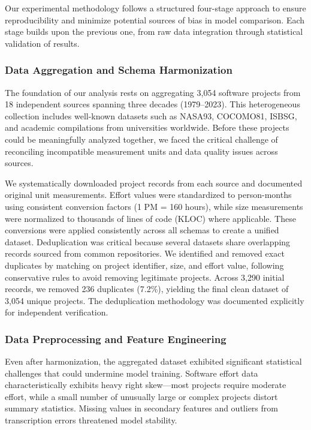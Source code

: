 \documentclass[11pt,a4paper]{article}
\begin{document}
Our experimental methodology follows a structured four-stage approach to ensure reproducibility and minimize potential sources of bias in model comparison. Each stage builds upon the previous one, from raw data integration through statistical validation of results.

\subsubsection{Data Aggregation and Schema Harmonization}

The foundation of our analysis rests on aggregating 3,054 software projects from 18 independent sources spanning three decades (1979--2023). This heterogeneous collection includes well-known datasets such as NASA93, COCOMO81, ISBSG, and academic compilations from universities worldwide. Before these projects could be meaningfully analyzed together, we faced the critical challenge of reconciling incompatible measurement units and data quality issues across sources.

We systematically downloaded project records from each source and documented original unit measurements. Effort values were standardized to person-months using consistent conversion factors (1 PM = 160 hours), while size measurements were normalized to thousands of lines of code (KLOC) where applicable. These conversions were applied consistently across all schemas to create a unified dataset. Deduplication was critical because several datasets share overlapping records sourced from common repositories. We identified and removed exact duplicates by matching on project identifier, size, and effort value, following conservative rules to avoid removing legitimate projects. Across 3,290 initial records, we removed 236 duplicates (7.2\%), yielding the final clean dataset of 3,054 unique projects. The deduplication methodology was documented explicitly for independent verification.

\subsubsection{Data Preprocessing and Feature Engineering}

Even after harmonization, the aggregated dataset exhibited significant statistical challenges that could undermine model training. Software effort data characteristically exhibits heavy right skew---most projects require moderate effort, while a small number of unusually large or complex projects distort summary statistics. Missing values in secondary features and outliers from transcription errors threatened model stability.
\end{document}
